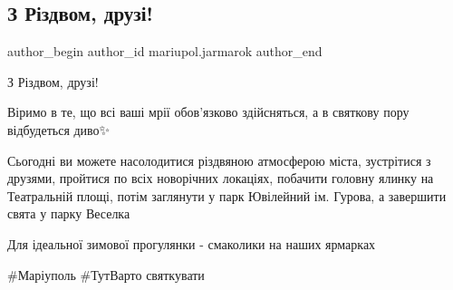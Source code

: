  
 
 
 
 

\subsection{З Різдвом, друзі!}
\label{sec:25_12_2021.fb.mariupol.jarmarok.1.z_rizdvom_druzi}

\ifcmt
 author_begin
   author_id mariupol.jarmarok
 author_end
\fi

З Різдвом, друзі! 🎊 

Віримо в те, що всі ваші мрії обов'язково здійсняться, а в святкову пору відбудеться диво✨

Сьогодні ви можете насолодитися різдвяною атмосферою міста, зустрітися з
друзями, пройтися по всіх новорічних локаціях, побачити головну ялинку на
Театральній площі, потім заглянути у парк Ювілейний ім. Гурова, а завершити
свята у парку Веселка 🎠 

Для ідеальної зимової прогулянки - смаколики на наших ярмарках🍭

\#Маріуполь \#ТутВарто святкувати
